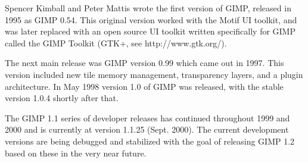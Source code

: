 Spencer Kimball and Peter Mattis wrote the first version of GIMP, released in
1995 as GIMP 0.54. This original version worked with the Motif UI toolkit, and
was later replaced with an open source UI toolkit written specifically for GIMP
called the GIMP Toolkit (GTK+, see http://www.gtk.org/).

The next main release was GIMP version 0.99 which came out in 1997. This
version included new tile memory management, transparency layers, and a plugin
architecture. In May 1998 version 1.0 of GIMP was released, with the stable
version 1.0.4 shortly after that.

The GIMP 1.1 series of developer releases has continued throughout 1999 and
2000 and is currently at version 1.1.25 (Sept.  2000). The current development
versions are being debugged and stabilized with the goal of releasing GIMP 1.2
based on these in the very near future.
